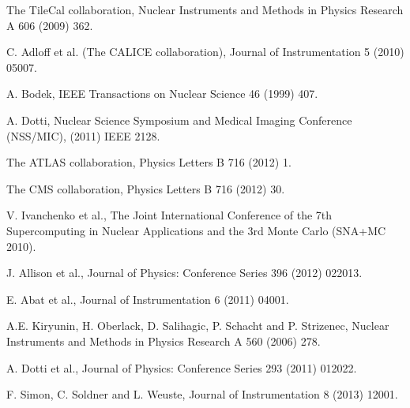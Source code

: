  The TileCal collaboration,
                    Nuclear Instruments and Methods in Physics Research A 606 (2009) 362.

 C. Adloff et al. (The CALICE collaboration),
                     Journal of Instrumentation 5 (2010) 05007.

 A. Bodek, IEEE Transactions on Nuclear Science 46 (1999) 407.

 A. Dotti, Nuclear Science Symposium and Medical Imaging Conference (NSS/MIC),
                  (2011) IEEE 2128.

 The ATLAS collaboration, Physics Letters B 716 (2012) 1.

 The CMS collaboration, Physics Letters B 716 (2012) 30.

 V. Ivanchenko et al., The Joint International Conference of the 7th Supercomputing
                     in Nuclear Applications and the 3rd Monte Carlo (SNA+MC 2010).

 J. Allison et al.,
                                 Journal of Physics: Conference Series 396 (2012) 022013.

 E. Abat et al., Journal of Instrumentation 6 (2011) 04001.

 A.E. Kiryunin, H. Oberlack, D. Salihagic, P. Schacht and P. Strizenec,
                          Nuclear Instruments and Methods in Physics Research A 560 (2006) 278.

 A. Dotti et al.,
                                 Journal of Physics: Conference Series 293 (2011) 012022.

 F. Simon, C. Soldner and L. Weuste,
                        Journal of Instrumentation 8 (2013) 12001.

